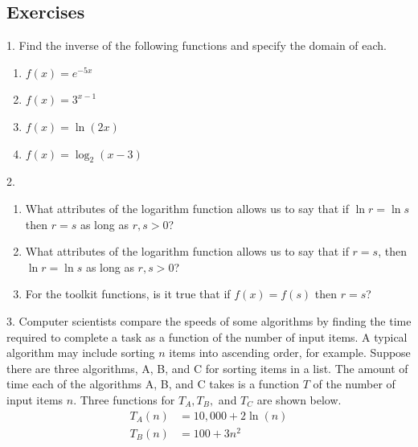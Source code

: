 \documentclass[10pt,]{book}
\theoremstyle{plain}
\theoremstyle{definition}
\theoremstyle{definition}
\theoremstyle{definition}
\numberwithin{equation}{section}
\newcommand{\amp}{&}
\begin{document}
\subsection[{Exercises}]{Exercises}\label{exercises-14}
\begin{exerciselist}
\item[1.]\hypertarget{exercise-91}{}\hypertarget{p-356}{}%
Find the inverse of the following functions and specify the domain of each. \leavevmode%
\begin{enumerate}[label=(\alph*)]
\item\hypertarget{li-243}{}\(f(x) = e^{-5x}\)%
\item\hypertarget{li-244}{}\(f(x) = 3^{x-1}\)%
\item\hypertarget{li-245}{}\(f(x) = \ln \left( 2x \right)\)%
\item\hypertarget{li-246}{}\(f(x) = \log_2 \left( x - 3 \right)\)%
\end{enumerate}
%
\par\smallskip
\item[2.]\hypertarget{exercise-92}{}\hypertarget{p-357}{}%
\leavevmode%
\begin{enumerate}[label=(\alph*)]
\item\hypertarget{li-247}{}What attributes of the logarithm function allows us to say that if \(\ln r = \ln s\) then \(r = s\) as long as \(r,s > 0\)?%
\item\hypertarget{li-248}{}What attributes of the logarithm function allows us to say that if \(r = s\), then \(\ln r = \ln s\) as long as \(r,s > 0\)?%
\item\hypertarget{li-249}{}For the toolkit functions, is it true that if \(f(x) = f(s)\) then \(r = s\)?%
\end{enumerate}
%
\par\smallskip
\item[3.]\hypertarget{exercise-93}{}\hypertarget{p-358}{}%
Computer scientists compare the speeds of some algorithms by finding the time required to complete a task as a function of the number of input items. A typical algorithm may include sorting \(n\) items into ascending order, for example. Suppose there are three algorithms, A, B, and C for sorting items in a list. The amount of time each of the algorithms A, B, and C takes is a function \(T\) of the number of input items \(n\). Three functions for \(T_A, T_B,\) and \(T_C\) are shown below.%
\begin{align*}
T_A(n) \amp = 10,000 + 2\ln(n)\\
T_B(n) \amp = 100 + 3n^2\\

\end{align*}
\end{exerciselist}
\end{document}
